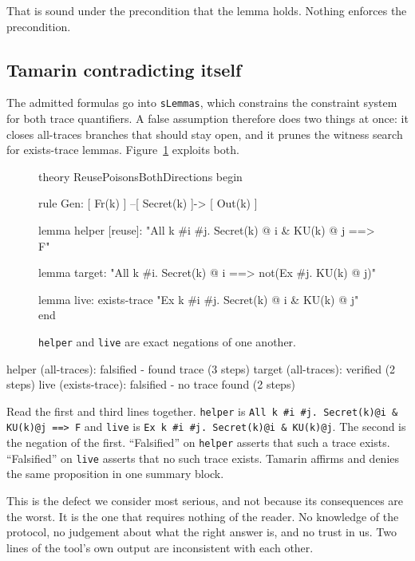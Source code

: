 \documentclass[version=preprint]{iacrcc}
\newcommand{\code}[1]{\texttt{\small #1}}
\newcommand{\tmc}[1]{\lstinline[style=tbase,language=TamarinL,
  backgroundcolor=\color{white},frame=none,basicstyle=\ttfamily\small]|#1|}
\theoremstyle{definition}
\theoremstyle{remark}
\begin{document}
That is sound under the precondition that the lemma holds. Nothing enforces the
precondition.

\subsection{Tamarin contradicting itself}

The admitted formulas go into \code{sLemmas}, which constrains the constraint
system for both trace quantifiers. A false assumption therefore does two things
at once: it closes all-traces branches that should stay open, and it prunes the
witness search for exists-trace lemmas. Figure~\ref{fig:poc08} exploits both.

\begin{figure}[t]
	\begin{tmlisting}
		theory ReusePoisonsBothDirections begin

		rule Gen: [ Fr(k) ] --[ Secret(k) ]-> [ Out(k) ]

		lemma helper [reuse]:
		"All k #i #j. Secret(k) @ i & KU(k) @ j ==> F"

		lemma target:
		"All k #i. Secret(k) @ i ==> not(Ex #j. KU(k) @ j)"

		lemma live: exists-trace
		"Ex k #i #j. Secret(k) @ i & KU(k) @ j"
		end
	\end{tmlisting}
	\caption{\code{helper} and \code{live} are exact negations of one
		another.}\label{fig:poc08}
\end{figure}

\begin{outlisting}
	helper (all-traces):   falsified - found trace (3 steps)
	target (all-traces):   verified (2 steps)
	live   (exists-trace): falsified - no trace found (2 steps)
\end{outlisting}

Read the first and third lines together. \code{helper} is
\tmc{All k #i #j. Secret(k)@i & KU(k)@j ==> F} and \code{live} is
\tmc{Ex k #i #j. Secret(k)@i & KU(k)@j}. The second is the negation of the
first. ``Falsified'' on \code{helper} asserts that such a trace exists.
``Falsified'' on \code{live} asserts that no such trace exists. Tamarin affirms
and denies the same proposition in one summary block.

This is the defect we consider most serious, and not because its consequences
are the worst. It is the one that requires nothing of the reader. No knowledge
of the protocol, no judgement about what the right answer is, and no trust in
us. Two lines of the tool's own output are inconsistent with each other.
\end{document}
